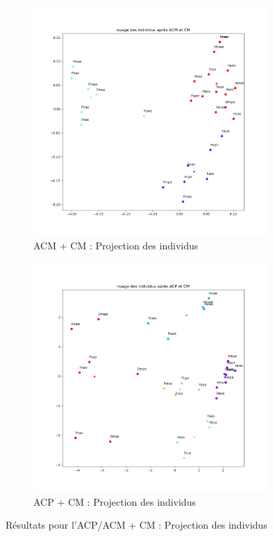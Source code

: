     \begin{figure}[!htb]
        \begin{subfigure}[b]{0.48\textwidth}
            \centering
            \includegraphics[width=0.98\textwidth]{img/Individus_ACM-CM.png}
            \caption{ACM + CM : Projection des individus}
            \label{Label_Individus_ACM-CM.png}
        \end{subfigure}
        \begin{subfigure}[b]{0.48\textwidth}
            \centering
            \includegraphics[width=0.98\textwidth]{img/Individus_ACP-CM.png}
            \caption{ACP + CM : Projection des individus}
            \label{Label_Individus_ACP-CM.png}
        \end{subfigure}
        \caption{Résultats pour l'ACP/ACM + CM : Projection des individus}
        \label{Label_Individus_ACP_ACM-CM.png}
    \end{figure}
    
